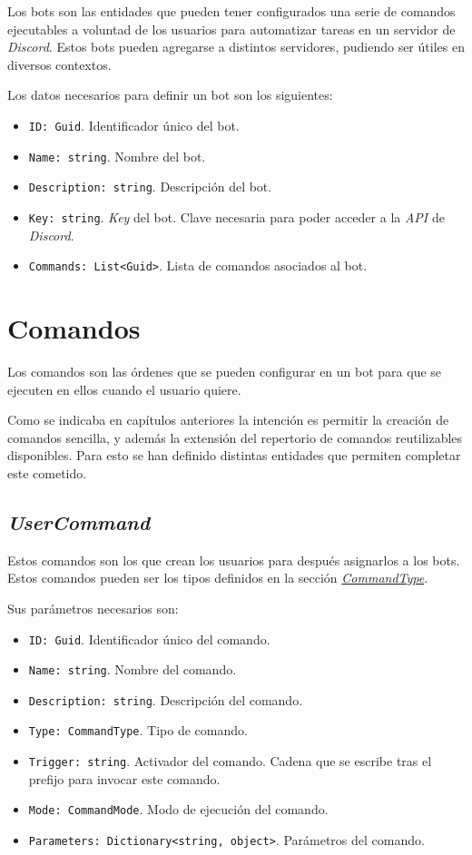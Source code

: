 Los bots son las entidades que pueden tener configurados una serie de comandos ejecutables a voluntad de los usuarios para automatizar tareas en un servidor de \textit{Discord}. Estos bots pueden agregarse a distintos servidores, pudiendo ser útiles en diversos contextos.

Los datos necesarios para definir un bot son los siguientes:

\begin{itemize}
	\item \verb|ID: Guid|. Identificador único del bot.
	\item \verb|Name: string|. Nombre del bot.
	\item \verb|Description: string|. Descripción del bot.
	\item \verb|Key: string|. \textit{Key} del bot. Clave necesaria para poder acceder a la \textit{API} de \textit{Discord}.
	\item \verb|Commands: List<Guid>|. Lista de comandos asociados al bot.
\end{itemize}





\section{Comandos}

Los comandos son las órdenes que se pueden configurar en un bot para que se ejecuten en ellos cuando el usuario quiere.

Como se indicaba en capítulos anteriores la intención es permitir la creación de comandos sencilla, y además la extensión del repertorio de comandos reutilizables disponibles. Para esto se han definido distintas entidades que permiten completar este cometido.

\subsection{\textit{UserCommand}}

Estos comandos son los que crean los usuarios para después asignarlos a los bots. Estos comandos pueden ser los tipos definidos en la sección \hyperref[sec:commandtype]{\textit{CommandType}}.

Sus parámetros necesarios son:

\begin{itemize}
	\item \verb|ID: Guid|. Identificador único del comando.
	\item \verb|Name: string|. Nombre del comando.
	\item \verb|Description: string|. Descripción del comando.
	\item \verb|Type: CommandType|. Tipo de comando.
	\item \verb|Trigger: string|. Activador del comando. Cadena que se escribe tras el prefijo para invocar este comando.
	\item \verb|Mode: CommandMode|. Modo de ejecución del comando.
	\item \verb|Parameters: Dictionary<string, object>|. Parámetros del comando.
\end{itemize}


